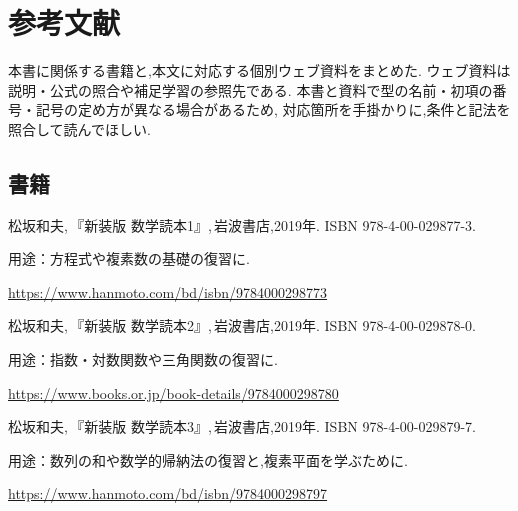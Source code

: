 \chapter{参考文献}\label{章：参考文献}

本書に関係する書籍と,本文に対応する個別ウェブ資料をまとめた.
ウェブ資料は説明・公式の照合や補足学習の参照先である.
本書と資料で型の名前・初項の番号・記号の定め方が異なる場合があるため,
対応箇所を手掛かりに,条件と記法を照合して読んでほしい.

\begingroup
  \raggedright
  \section{書籍}
  \begin{enumerate}[label={[\arabic*]}]
    \item \begin{minipage}[t]{\linewidth}\raggedright
        松坂和夫,\,『新装版 数学読本1』,\,岩波書店,2019年.
        ISBN 978-4-00-029877-3.
        \par{\small 用途：方程式や複素数の基礎の復習に.\par}
        \par\noindent\url{https://www.hanmoto.com/bd/isbn/9784000298773}\par
      \end{minipage}\par\smallskip

    \item \begin{minipage}[t]{\linewidth}\raggedright
        松坂和夫,\,『新装版 数学読本2』,\,岩波書店,2019年.
        ISBN 978-4-00-029878-0.
        \par{\small 用途：指数・対数関数や三角関数の復習に.\par}
        \par\noindent\url{https://www.books.or.jp/book-details/9784000298780}\par
      \end{minipage}\par\smallskip

    \item \begin{minipage}[t]{\linewidth}\raggedright
        松坂和夫,\,『新装版 数学読本3』,\,岩波書店,2019年.
        ISBN 978-4-00-029879-7.
        \par{\small 用途：数列の和や数学的帰納法の復習と,複素平面を学ぶために.\par}
        \par\noindent\url{https://www.hanmoto.com/bd/isbn/9784000298797}\par
      \end{minipage}\par\smallskip


\end{enumerate}
